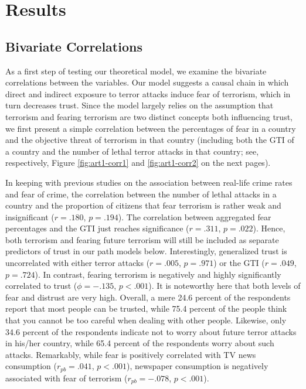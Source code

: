 \section{Results}
\subsection{Bivariate Correlations}
As a first step of testing our theoretical model, we examine the bivariate correlations between the variables. Our model suggests a causal chain in which direct and indirect exposure to terror attacks induce fear of terrorism, which in turn decreases trust. Since the model largely relies on the assumption that terrorism and fearing terrorism are two distinct concepts both influencing trust, we first present a simple correlation between the percentages of fear in a country and the objective threat of terrorism in that country (including both the GTI of a country and the number of lethal terror attacks in that country; see, respectively, Figure \ref{fig:art1-corr1} and \ref{fig:art1-corr2} on the next pages). 


In keeping with previous studies on the association between real-life crime rates and fear of crime, the correlation between the number of lethal attacks in a country and the proportion of citizens that fear terrorism is rather weak and insignificant ($r = .180$, $p = .194$). The correlation between aggregated fear percentages and the GTI just reaches significance ($r = .311$, $p = .022$). Hence, both terrorism and fearing future terrorism will still be included as separate predictors of trust in our path models below. Interestingly, generalized trust is uncorrelated with either terror attacks ($r = .005$, $p = .971$) or the GTI ($r = .049$, $p = .724$). In contrast, fearing terrorism is negatively and highly significantly correlated to trust ($\phi = -.135$, $p < .001$). It is noteworthy here that both levels of fear and distrust are very high. Overall, a mere 24.6 percent of the respondents report that most people can be trusted, while 75.4 percent of the people think that you cannot be too careful when dealing with other people. Likewise, only 34.6 percent of the respondents indicate not to worry about future terror attacks in his/her country, while 65.4 percent of the respondents worry about such attacks. Remarkably, while fear is positively correlated with TV news consumption ($r_{pb} = .041$, $p < .001$), newspaper consumption is negatively associated with fear of terrorism ($r_{pb} = -.078$, $p < .001$).

